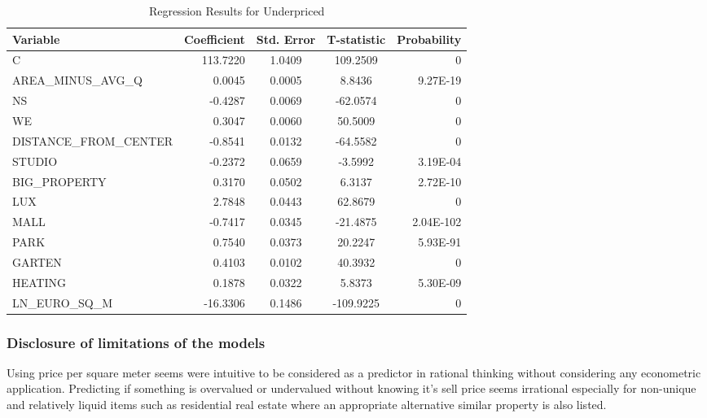 \documentclass[]{article}
\begin{document}
\begin{table}[h!]
	\centering
	\caption{Regression Results for Underpriced}
	\begin{tabular}{lrccr}
		\hline
		Variable & Coefficient & Std. Error & T-statistic & Probability \\
		\hline
		C                      & 113.7220 & 1.0409 & 109.2509  & 0                    \\
		AREA\_MINUS\_AVG\_Q    & 0.0045   & 0.0005 & 8.8436    & 9.27E-19             \\
		NS                     & -0.4287  & 0.0069 & -62.0574  & 0                    \\
		WE                     & 0.3047   & 0.0060 & 50.5009   & 0                    \\
		DISTANCE\_FROM\_CENTER & -0.8541  & 0.0132 & -64.5582  & 0                    \\
		STUDIO                 & -0.2372  & 0.0659 & -3.5992   & 3.19E-04			  \\
		BIG\_PROPERTY          & 0.3170   & 0.0502 & 6.3137    & 2.72E-10             \\
		LUX                    & 2.7848   & 0.0443 & 62.8679   & 0                    \\
		MALL                   & -0.7417  & 0.0345 & -21.4875  & 2.04E-102            \\
		PARK                   & 0.7540   & 0.0373 & 20.2247   & 5.93E-91             \\
		GARTEN                 & 0.4103   & 0.0102 & 40.3932   & 0                    \\
		HEATING                & 0.1878   & 0.0322 & 5.8373    & 5.30E-09             \\
		LN\_EURO\_SQ\_M        & -16.3306 & 0.1486 & -109.9225 & 0                    \\
		\hline
	\end{tabular}
\end{table}



\subsubsection{Disclosure of limitations of the models}

Using price per square meter seems were intuitive to be considered as a predictor in rational thinking without considering any econometric application. Predicting if something is overvalued or undervalued without knowing it's sell price seems irrational especially for non-unique and relatively liquid items such as residential real estate where an appropriate alternative similar property is also listed.\\
\end{document}
